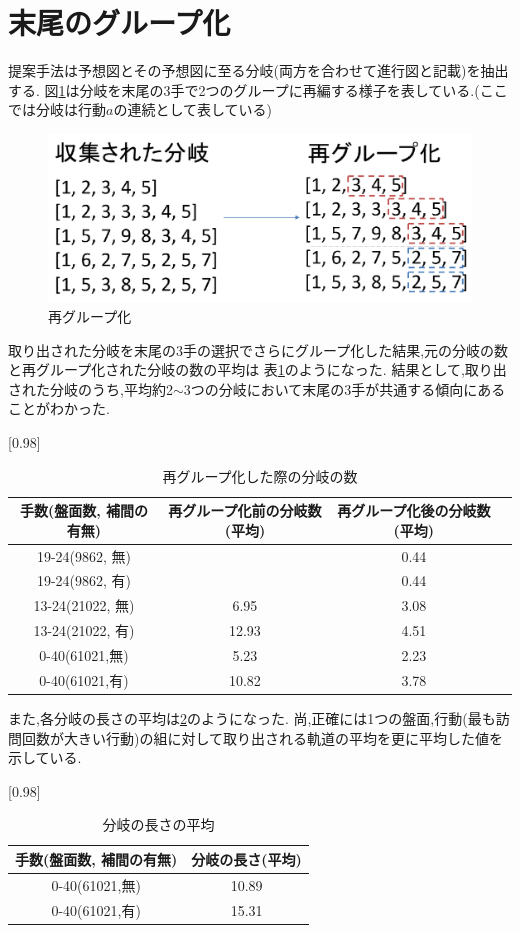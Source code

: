 \section{末尾のグループ化}
提案手法は予想図とその予想図に至る分岐(両方を合わせて進行図と記載)を抽出する.
図\ref{fig:regroup}は分岐を末尾の3手で2つのグループに再編する様子を表している.(ここでは分岐は行動$a$の連続として表している)
\begin{figure}[t]
	\centering
	\includegraphics[width=\linewidth]{./figure/regroup.pdf}
	\caption{再グループ化}
	\label{fig:regroup}
\end{figure}
取り出された分岐を末尾の3手の選択でさらにグループ化した結果,元の分岐の数と再グループ化された分岐の数の平均は
表\ref{table:tail}のようになった.
結果として,取り出された分岐のうち,平均約2$\sim$3つの分岐において末尾の3手が共通する傾向にあることがわかった.
\begin{table}[H]
	\caption{再グループ化した際の分岐の数}
    \scriptsize
    \label{table:tail}
	\centering
	\scalebox{0.98}[0.98]{
		\begin{tabular}{c|c|c||c}
			手数(盤面数, 補間の有無)&  再グループ化前の分岐数(平均)&  再グループ化後の分岐数(平均)\\ \hline
			19-24(9862, 無)    &  & 0.44  \\
			19-24(9862, 有)    &  & 0.44   \\
			13-24(21022, 無)   & 6.95 & 3.08  \\
			13-24(21022, 有)   & 12.93 & 4.51 \\
		    0-40(61021,無)& 5.23 & 2.23\\
		    0-40(61021,有)& 10.82 & 3.78\\
		\end{tabular}
	}

	
\end{table}
また,各分岐の長さの平均は\ref{fig:length}のようになった.
尚,正確には1つの盤面,行動(最も訪問回数が大きい行動)の組に対して取り出される軌道の平均を更に平均した値を示している.
\begin{table}[H]
	\caption{分岐の長さの平均}
    \scriptsize
    \label{fig:length}
	\centering
	\scalebox{0.98}[0.98]{
		\begin{tabular}{c|c}
			手数(盤面数, 補間の有無)&  分岐の長さ(平均)\\ \hline
		    0-40(61021,無)& 10.89\\
		    0-40(61021,有)& 15.31\\
		\end{tabular}
	}	
\end{table}

